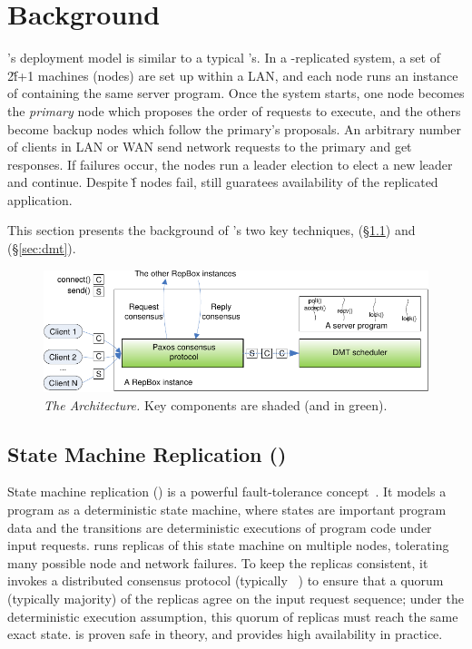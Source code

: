 \section{\repbox Background} \label{sec:background}

\repbox's deployment model is similar to a typical \smr's. In a \repbox-replicated
system, a set of 2\v{f}+1 machines (nodes) are set up within a LAN,
and each node runs an instance of \repbox containing the same server
program. Once the \repbox system starts, one node becomes the \emph{primary}
node which proposes the order of requests to execute, and the others
become backup nodes which follow the primary's proposals. An arbitrary
number of clients in LAN or WAN send network requests to the primary and
get responses.  If failures occur, the nodes run a leader election to
elect a new leader and continue. Despite \v{f} nodes fail, \repbox still 
guaratees availability of the replicated application.

This section presents the background of \repbox's two key techniques, 
\smr (\S\ref{sec:smr}) and \dmt (\S\ref{sec:dmt}).

\begin{figure}[t]
\vspace{.20in}
\centering
\includegraphics[width=.47\textwidth]{figures/arch}
\vspace{.06in}
\caption{{\em The \repbox Architecture.} Key components are shaded (and in
  green).} \label{fig:repbox}
\vspace{-.05in}
\end{figure}


\subsection{State Machine Replication (\smr)} \label{sec:smr}

State machine replication (\smr) is a powerful fault-tolerance
concept~\cite{paxos:practical}.  It models a program as a deterministic state 
machine, where states are important program data and the transitions are 
deterministic executions of program code under input requests.  \smr runs 
replicas of this state machine on multiple nodes, tolerating many possible node 
and network failures.  To keep the replicas consistent, it invokes a
distributed consensus protocol (typically \paxos~\cite{paxos, paxos:simple, 
paxos:practical}) to ensure that a quorum (typically majority) of the replicas 
agree on the input request sequence; under the deterministic execution 
assumption, this quorum of replicas must reach the same exact state.  \smr is 
proven safe in theory, and provides high availability in practice.


